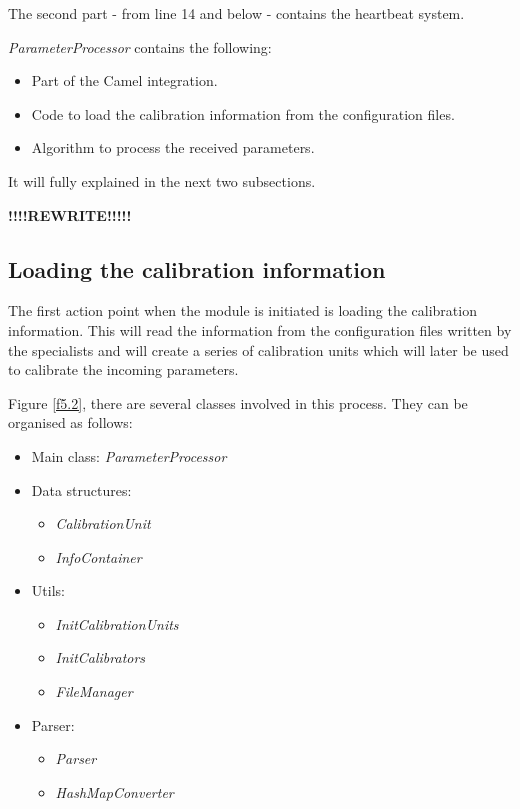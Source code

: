 The second part - from line 14 and below - contains the heartbeat system.


\emph{ParameterProcessor} contains the following:
\begin{itemize}
\item Part of the Camel integration.
\item Code to load the calibration information from the configuration files.
\item Algorithm to process the received parameters.
\end{itemize}

It will fully explained in the next two subsections.


\textbf{!!!!REWRITE!!!!!}

\subsection{Loading the calibration information}

The first action point when the module is initiated is loading the calibration information. This will read the information from the configuration files written by the specialists and will create a series of calibration units which will later be used to calibrate the incoming parameters.

Figure \ref{f5.2}, there are several classes involved in this process. They can be organised as follows:
\begin{itemize}
\item Main class: \emph{ParameterProcessor}
\item Data structures:
	\begin{itemize}
		\item \emph{CalibrationUnit}
		\item \emph{InfoContainer}
	\end{itemize}
\item Utils:
	\begin{itemize}
		\item \emph{InitCalibrationUnits}
		\item \emph{InitCalibrators}
		\item \emph{FileManager}
	\end{itemize}
\item Parser:
	\begin{itemize}
		\item \emph{Parser}
		\item \emph{HashMapConverter}
	\end{itemize}
\end{itemize}


